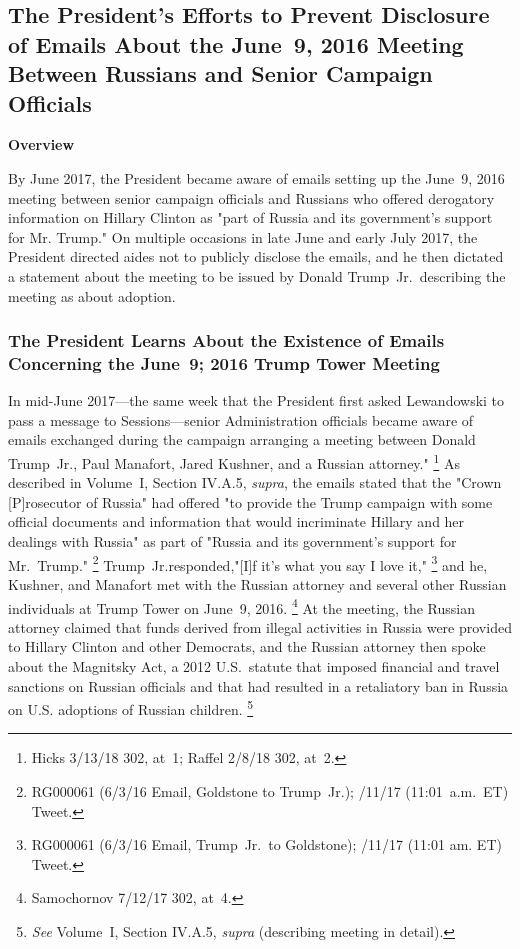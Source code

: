 \subsection{The President's Efforts to Prevent Disclosure of Emails About the June~9, 2016 Meeting Between Russians and Senior Campaign Officials}

\begin{center}
\textbf{Overview}
\end{center}

By June 2017, the President became aware of emails setting up the June~9, 2016 meeting between senior campaign officials and Russians who offered derogatory information on Hillary Clinton as "part of Russia and its government's support for Mr. Trump."
On multiple occasions in late June and early July 2017, the President directed aides not to publicly disclose the emails, and he then dictated a statement about the meeting to be issued by Donald Trump~Jr.\ describing the meeting as about adoption.

\subsubsection{The President Learns About the Existence of Emails Concerning the June~9; 2016 Trump Tower Meeting}

In mid-June 2017---the same week that the President first asked Lewandowski to pass a message to Sessions---senior Administration officials became aware of emails exchanged during the campaign arranging a meeting between Donald Trump~Jr., Paul Manafort, Jared Kushner, and a Russian attorney."%
\footnote{Hicks 3/13/18 302, at~1;
Raffel 2/8/18 302, at~2.}
As described in Volume~I, Section IV.A.5, \textit{supra}, the emails stated that the "Crown [P]rosecutor of Russia" had offered "to provide the Trump campaign with some official documents and information that would incriminate Hillary and her dealings with Russia" as part of "Russia and its government's support for Mr.~Trump."%
\footnote{RG000061 (6/3/16 Email, Goldstone to Trump~Jr.);
/11/17 (11:01~a.m.~ET) Tweet.}
Trump~Jr.responded,"[I]f it's what you say I love it,"%
\footnote{RG000061 (6/3/16 Email, Trump~Jr.\ to Goldstone);
/11/17 (11:01 am. ET) Tweet.}
and he, Kushner, and Manafort met with the Russian attorney and several other Russian individuals at Trump Tower on June~9, 2016.%
\footnote{Samochornov 7/12/17 302, at~4.}
At the meeting, the Russian attorney claimed that funds derived from illegal activities in Russia were provided to Hillary Clinton and other Democrats, and the Russian attorney then spoke about the Magnitsky Act, a 2012 U.S.~statute that imposed financial and travel sanctions on Russian officials and that had resulted in a retaliatory ban in Russia on U.S. adoptions of Russian children.%
\footnote{\textit{See} Volume~I, Section IV.A.5, \textit{supra} (describing meeting in detail).}

